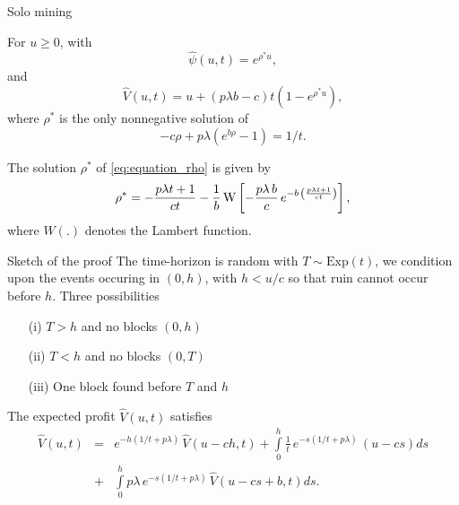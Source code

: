 \documentclass{beamer}
\begin{document}
\appendix
\begin{frame}{Solo mining}
\scriptsize
\begin{tcolorbox}[enhanced,drop shadow, title=Theorem (profit and ruin when mining solo)]
For $u\geq0$, with 
\begin{equation*}
\widehat{\psi}(u,t) = e^{\rho^\ast u},
\end{equation*}
and 
\begin{equation*}
\widehat{V}(u,t) = u+(p\lambda b-c)t\left(1-e^{\rho^\ast u }\right),
\end{equation*}
where $\rho^\ast$ is the only nonnegative solution of
\begin{equation}\label{eq:equation_rho}
-c\rho + p\lambda(e^{b\rho}-1) = 1/t.
\end{equation}
\end{tcolorbox}
\begin{tcolorbox}[enhanced,drop shadow, title=Lambert function]
The solution $\rho^\ast$ of \eqref{eq:equation_rho} is given by 
\begin{equation*}
  \rho^{\ast}=-\frac{p \lambda t+1}{ct}
  -\frac{1}{b} \,{\rm W} \left[-\frac{p\lambda
    \,b}{c}\,{e^{-b\,\left(\frac{p \lambda t+1}{ct}\right)}}
  \right],
  \end{equation*}
  where $W(.)$ denotes the Lambert function.
\end{tcolorbox}
\end{frame}
\begin{frame}{Sketch of the proof}
\scriptsize
The time-horizon is random with $T\sim\text{Exp}(t)$, we condition upon the events occuring in $(0,h)$, with $h<u/c$ so that ruin cannot occur before $h$. Three possibilities
\begin{itemize}
  \item[(i)] $T>h$ and no blocks $(0,h)$
  \item[(ii)] $T<h$ and no blocks $(0,T)$
  \item[(iii)] One block found before $T$ and $h$
\end{itemize}
The expected profit $\widehat{V}(u,t)$ satisfies
\begin{eqnarray*}
  \widehat{V}(u,t)& =&e^{-h(1/t + p\lambda)}\,\widehat{V}(u-ch,t)+\int\limits_0^h\frac1t\, e^{-s(1/t + p\lambda)}\,(u-cs)ds\\
  &+&\int\limits_0^h p\lambda\, e^{-s(1/t + p\lambda)}\,\widehat{V}(u-cs+b,t)ds.
  \end{eqnarray*}
  \end{frame}
\end{document}
